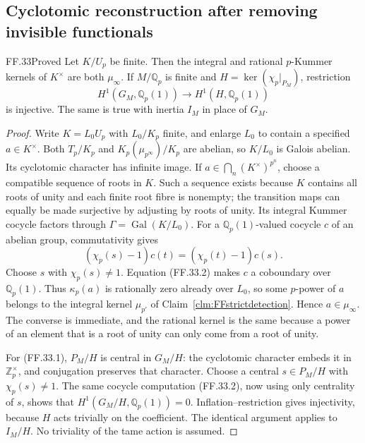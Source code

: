 \subsection{Cyclotomic reconstruction after removing invisible functionals}

\begin{claim}{FF.33}{Proved}\label{clm:FFcyclotomiccohomology}
Let \(K/U_p\) be finite. Then the integral and
rational \(p\)-Kummer kernels of \(K^\times\)
are both \(\mu_\infty\). If \(M/\mathbb Q_p\)
is finite and
\(H=\ker(\chi_p|_{P_M})\), restriction
\[
 H^1(G_M,\mathbb Q_p(1))\longrightarrow
                  H^1(H,\mathbb Q_p(1))
                                                        \tag{FF.33.1}
\]
is injective. The same is true with inertia
\(I_M\) in place of \(G_M\).
\end{claim}
\begin{proof}
Write \(K=L_0U_p\) with \(L_0/K_p\) finite,
and enlarge \(L_0\) to contain a specified
\(a\in K^\times\). Both \(T_p/K_p\) and
\(K_p(\mu_{p^\infty})/K_p\) are abelian, so
\(K/L_0\) is Galois abelian. Its cyclotomic
character has infinite image.
If \(a\in\bigcap_n(K^\times)^{p^n}\), choose
a compatible sequence of roots in \(K\).
Such a sequence exists because \(K\) contains
all roots of unity and each finite root fibre
is nonempty; the transition maps can equally
be made surjective by adjusting by roots of
unity. Its integral Kummer cocycle factors
through \(\Gamma=\operatorname{Gal}(K/L_0)\).
For a \(\mathbb Q_p(1)\)-valued cocycle \(c\)
of an abelian group, commutativity gives
\[
 (\chi_p(s)-1)c(t)=(\chi_p(t)-1)c(s).
                                                        \tag{FF.33.2}
\]
Choose \(s\) with \(\chi_p(s)\ne1\). Equation
(FF.33.2) makes \(c\) a coboundary over
\(\mathbb Q_p(1)\). Thus \(\kappa_p(a)\)
is rationally zero already over \(L_0\), so
some \(p\)-power of \(a\) belongs to the
integral kernel \(\mu_{p'}\) of
Claim~\ref{clm:FFstrictdetection}. Hence
\(a\in\mu_\infty\). The converse is immediate,
and the rational kernel is the same because
a power of an element that is a root of unity
can only come from a root of unity.

For (FF.33.1), \(P_M/H\) is central in
\(G_M/H\): the cyclotomic character embeds
it in \(\mathbb Z_p^\times\), and conjugation
preserves that character. Choose a central
\(s\in P_M/H\) with \(\chi_p(s)\ne1\).
The same cocycle computation (FF.33.2), now
using only centrality of \(s\), shows that
\(H^1(G_M/H,\mathbb Q_p(1))=0\).
Inflation--restriction gives injectivity,
because \(H\) acts trivially on the coefficient.
The identical argument applies to \(I_M/H\).
No triviality of the tame action is assumed.
\end{proof}


